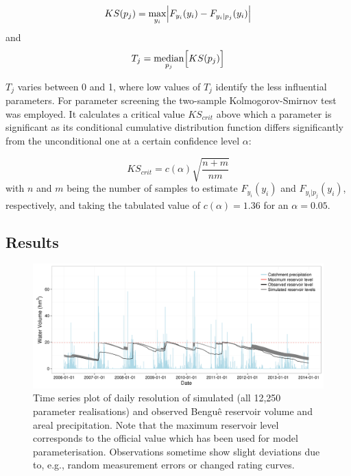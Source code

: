 \begin{equation}
	KS(p_j) = \max_{y_i} \Bigl| F_{y_i}(y_i) - F_{y_i|p_j}(y_i) \Bigr|
\end{equation}
and
\begin{equation}
	T_j = \underset{p_j}{\mathrm{median}} \Bigl[ KS(p_j) \Bigr]
\end{equation}

$T_j$ varies between 0 and 1, where low values of $T_j$ identify the less influential parameters.
For parameter screening the two-sample Kolmogorov-Smirnov test was employed.
It calculates a critical value $KS_{crit}$ above which a parameter is significant as its conditional cumulative distribution function differs significantly from the unconditional one at a certain confidence level $\alpha$:

\begin{equation}
	KS_{crit} = c(\alpha) \sqrt{\frac{n+m}{nm}}
\end{equation}
with $n$ and $m$ being the number of samples to estimate $F_{y_i}(y_i)$ and $F_{y_i|p_j}(y_i)$, respectively, and taking the tabulated value of $c(\alpha) = 1.36$ for an $\alpha = 0.05$.


\subsection{Results}
\label{sec:results}

\begin{figure}[t]
\includegraphics[width=\linewidth]{../analysis/comparison_results/Bengue_resvol_overview.png}
\caption{Time series plot of daily resolution of simulated (all 12,250 parameter realisations) and observed Bengu\^e reservoir volume and areal precipitation. Note that the maximum reservoir level corresponds to the official value which has been used for model parameterisation. Observations sometime show slight deviations due to, e.g., random measurement errors or changed rating curves.}
\label{fig:resvol}
\end{figure}

